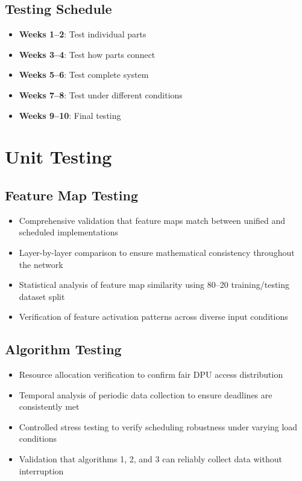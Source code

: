 \subsection{Testing Schedule}\label{subsec:testing-schedule}

\begin{itemize}
\item \textbf{Weeks 1--2}: Test individual parts
\item \textbf{Weeks 3--4}: Test how parts connect
\item \textbf{Weeks 5--6}: Test complete system
\item \textbf{Weeks 7--8}: Test under different conditions
\item \textbf{Weeks 9--10}: Final testing
\end{itemize}

\section{Unit Testing}\label{sec:unit-testing}

\subsection{Feature Map Testing}\label{subsec:feature-map-testing}

\begin{itemize}
\item Comprehensive validation that feature maps match between unified and scheduled implementations
\item Layer-by-layer comparison to ensure mathematical consistency throughout the network
\item Statistical analysis of feature map similarity using 80--20 training/testing dataset split
\item Verification of feature activation patterns across diverse input conditions
\end{itemize}

\subsection{Algorithm Testing}\label{subsec:algorithm-testing}

\begin{itemize}
\item Resource allocation verification to confirm fair DPU access distribution
\item Temporal analysis of periodic data collection to ensure deadlines are consistently met
\item Controlled stress testing to verify scheduling robustness under varying load conditions
\item Validation that algorithms 1, 2, and 3 can reliably collect data without interruption
\end{itemize}

